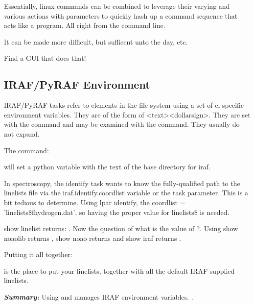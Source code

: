 Essentially, linux commands can be combined to leverage their varying
and various actions with parameters to quickly hash up a command sequence
that acts like a program. All right from the command line.

It can be made more difficult, but sufficent unto the day, etc.

Find a GUI that does that!


\subsection{IRAF/PyRAF Environment}  \label{sec:IRAFPyRAFEnvironment}

IRAF/PyRAF tasks refer to elements in the file system using a set of
cl specific environment variables. They are of the form of <text><dollarsign>.
They are set with the  command and may be examined with the 
command. They usually do not expand.

The command:


will set a python variable with the text of the base directory for iraf.

In spectroscopy, the identify task wants to know the fully-qualified
path to the linelists file via the iraf.identify.coordlist variable or
the  task parameter. This is a bit tedious to determine.
Using lpar identify, the coordlist = 'linelists\$fhydrogen.dat', so
having the proper value for linelists\$ is needed.

show linelist returns:  . Now the question of
what is the value of ?. Using show noaolib returns
, show noao returns  and show iraf
returns .

Putting it all together:


is the place to put your linelists, together with all the default IRAF
supplied linelists.


\textbf{\emph{Summary:}} Using  and  manages IRAF
environment variables. .

